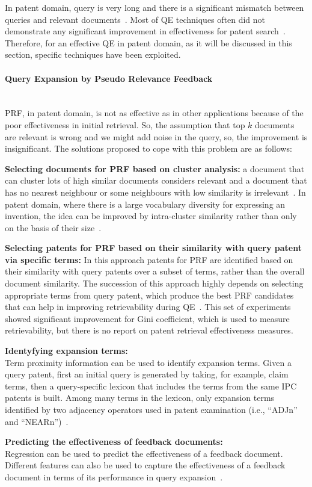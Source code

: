 In patent domain, query is very long and there is a significant mismatch between queries and relevant documents~\citep{roda2010clef, magdy2010exploring}. Most of QE techniques often did not demonstrate any significant improvement in effectiveness for patent search~\citep{kishida2003experiment, konishi2005query}. Therefore, for an effective QE in patent domain, as it will be discussed in this section, specific techniques have been exploited.
\paragraph{Query Expansion by Pseudo Relevance Feedback}
\ \\
PRF, in patent domain, is not as effective as in other applications because of the poor effectiveness in initial retrieval. So, the assumption that top $ k $ documents are relevant is wrong and we might add noise in the query, so, the improvement is insignificant. The solutions proposed to cope with this problem are as follows:
\begin{list}{-}{}
\item \textbf{Selecting documents for PRF based on cluster analysis:} a document that can cluster lots of high similar documents considers relevant and a document that has no nearest neighbour or some neighbours with low similarity is irrelevant~\citep{lee2008cluster}. In patent domain, where there is a large vocabulary diversity for expressing an invention, the idea can be improved by intra-cluster similarity rather than only on the basis of their size~\citep{bashir2009improving}. 
\item \textbf{Selecting patents for PRF based on their similarity with query patent via specific terms:} In this approach patents for PRF are identified based on their similarity with query patents over a subset of terms, rather than the overall document similarity. The succession of this approach highly depends on selecting appropriate terms from query patent, which produce the best PRF candidates that can help in improving retrievability during QE~\citep{bashir2010improving}. This set of experiments showed significant improvement for Gini coefficient, which is used to measure retrievability, but there is no report on patent retrieval effectiveness measures.
\item \textbf{Identyfying expansion terms: } 
\ \\
Term proximity information can be used to identify expansion terms. Given a query patent, first an initial query is generated by taking, for example, claim terms, then a query-specific lexicon that includes the terms from the same IPC patents is  built. Among many terms in the lexicon, only expansion terms identified by two adjacency operators used in patent examination (i.e., ``ADJn'' and ``NEARn'')~\citep{mahdabi2013leveraging}.
\item \textbf{Predicting the effectiveness of feedback documents: } 
\ \\
Regression can be used to predict the effectiveness of a feedback document. Different features can also be used to capture the effectiveness of a feedback document in terms of its performance in query expansion~\citep{mahdabi2012learning}.
\end{list}
